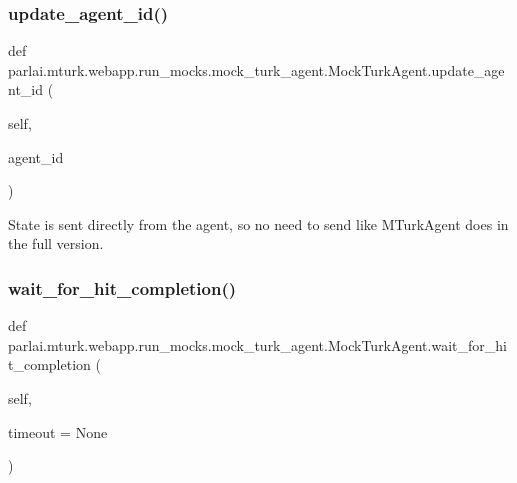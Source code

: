 \subsubsection{\texorpdfstring{update\+\_\+agent\+\_\+id()}{update\_agent\_id()}}
{\footnotesize\ttfamily def parlai.\+mturk.\+webapp.\+run\+\_\+mocks.\+mock\+\_\+turk\+\_\+agent.\+Mock\+Turk\+Agent.\+update\+\_\+agent\+\_\+id (\begin{DoxyParamCaption}\item[{}]{self,  }\item[{}]{agent\+\_\+id }\end{DoxyParamCaption})}

\begin{DoxyVerb}State is sent directly from the agent, so no need to send like MTurkAgent does
in the full version.
\end{DoxyVerb}
 \mbox{\label{classparlai_1_1mturk_1_1webapp_1_1run__mocks_1_1mock__turk__agent_1_1MockTurkAgent_afdb671992bd015c5dac40dd5a0ae828b}} 
\subsubsection{\texorpdfstring{wait\+\_\+for\+\_\+hit\+\_\+completion()}{wait\_for\_hit\_completion()}}
{\footnotesize\ttfamily def parlai.\+mturk.\+webapp.\+run\+\_\+mocks.\+mock\+\_\+turk\+\_\+agent.\+Mock\+Turk\+Agent.\+wait\+\_\+for\+\_\+hit\+\_\+completion (\begin{DoxyParamCaption}\item[{}]{self,  }\item[{}]{timeout = {\ttfamily None} }\end{DoxyParamCaption})}




